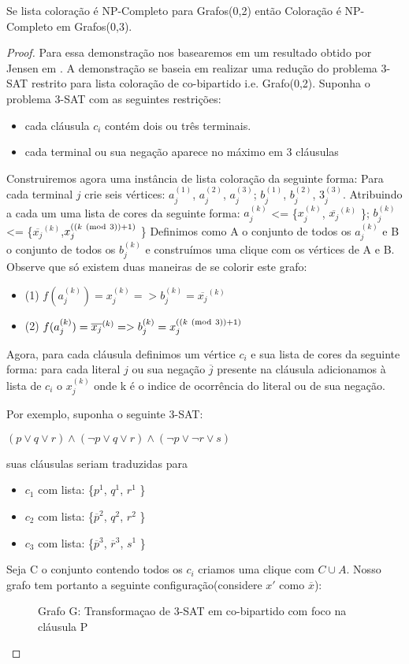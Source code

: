 \begin{corolario}
	Se lista coloração é NP-Completo para Grafos(0,2) então Coloração é NP-Completo em Grafos(0,3).
	\begin{proof}
		Para essa demonstração nos basearemos em um resultado obtido por Jensen em \cite{jansen1999}. A demonstração se baseia em realizar uma redução do problema 3-SAT restrito para lista coloração de co-bipartido i.e. Grafo(0,2).
		Suponha o problema 3-SAT com as seguintes restrições:
		\begin{itemize}
			\item cada cláusula $c_i$ contém dois ou três terminais.
			\item cada terminal ou sua negação aparece no máximo em 3 cláusulas
		\end{itemize}
		Construiremos agora uma instância de lista coloração da seguinte forma:\newline
		Para cada terminal $j$ crie seis vértices:
		$a_j^{(1)}$, $a_j^{(2)}$, $a_j^{(3)}$;
		$b_j^{(1)}$, $b_j^{(2)}$, $3_j^{(3)}$. Atribuindo a cada um uma lista de cores da seguinte forma:\newline
		$a_j^{(k)}$ <= \{$x_j^{(k)}$, $\overline{x_j}^{(k)}$ \}; $b_j^{(k)}$ <= \{$\overline{x_j}^{(k)}$,$x_j^{((k \ (\mathrm{mod}\ 3)) + 1 )}$ \}\newline
		Definimos como A o conjunto de todos os $a_j^{(k)}$ e B o conjunto de todos os $b_j^{(k)}$ e construímos uma clique com os vértices de A e B. Observe que só existem duas maneiras de se colorir este grafo:
		\begin{itemize}
			\item (1)  $f(a_j^{(k)}) = x_j^{(k)} => b_j^{(k)} = \overline{x_j}^{(k)}$
			\item (2)  $f(a_j^{(k)}) = \overline{x_j}^{(k)} => b_j^{(k)} = x_j^{((k \ (\mathrm{mod}\ 3)) + 1 )}$
		\end{itemize}
		Agora, para cada cláusula definimos um vértice $c_i$ e sua lista de cores da seguinte forma: para cada literal $j$ ou sua negação $\overline{j}$ presente na cláusula adicionamos à lista de $c_i$ o $x_j^{(k)}$ onde k é o indice de ocorrência do literal ou de sua negação.
		
		Por exemplo, suponha o seguinte 3-SAT:
		
		$(p \lor q \lor r) \land (\neg{p} \lor q \lor r) \land (\neg{p} \lor \neg{r} \lor s)$
		
		suas cláusulas seriam traduzidas para
		\begin{itemize}
			\item $c_1$ com lista: \{$p^1$, $q^1$, $r^1$ \}
			\item $c_2$ com lista: \{$\overline{p}^2$, $q^2$, $r^2$ \}
			\item $c_3$ com lista: \{$\overline{p}^3$, $\overline{r}^3$, $s^1$ \}
		\end{itemize}
		Seja C o conjunto contendo todos os $c_i$ criamos uma clique com $C \cup A$.
		Nosso grafo tem portanto a seguinte configuração(considere $x'$ como $\overline{x}$):
		\begin{figure}[!ht]
			\centering
			
			\caption{Grafo G: Transformaçao de 3-SAT em co-bipartido com foco na cláusula P }
		\end{figure}
		

\end{proof}
\end{corolario}
